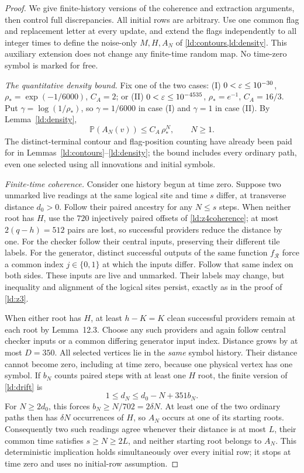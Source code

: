 \begin{proof}
We give finite-history versions of the coherence and extraction arguments, then control full discrepancies. All initial rows are arbitrary. Use one common flag and replacement letter at every update, and extend the flags independently to all integer times to define the noise-only $M,H,A_N$ of \cref{ld:contours,ld:density}. This auxiliary extension does not change any finite-time random map. No time-zero symbol is marked for free.

\emph{The quantitative density bound.} Fix one of the two cases:
(I) $0<\varepsilon\le10^{-30}$, $\rho_*=\exp(-1/6000)$, $C_A=2$; or
(II) $0<\varepsilon\le10^{-4535}$, $\rho_*=e^{-1}$, $C_A=16/3$. Put $\gamma=\log(1/\rho_*)$, so
$\gamma=1/6000$ in case (I) and $\gamma=1$ in case (II). By Lemma~\ref{ld:density},
\[
  \mathbb{P}(A_N(v))\le C_A\,\rho_*^N,\qquad N\ge1 .
\]
The distinct-terminal contour and flag-position counting have already been paid for in
Lemmas~\ref{ld:contours}--\ref{ld:density}; the bound includes every ordinary path, even one
selected using all innovations and initial symbols.

\emph{Finite-time coherence.}
Consider one history begun at time zero. Suppose two unmarked live readings at the same logical site and time $s$ differ, at transverse distance $d_0>0$. Follow their paired ancestry for any $N\le s$ steps. When neither root has $H$, use the $720$ injectively paired offsets of \cref{ld:z4coherence}; at most $2(q-h)=512$ pairs are lost, so successful providers reduce the distance by one. For the checker follow their central inputs, preserving their different tile labels. For the generator, distinct successful outputs of the same function $f_{\mathcal R}$ force a common index $j\in\{0,1\}$ at which the inputs differ. Follow that same index on both sides. These inputs are live and unmarked. Their labels may change, but inequality and alignment of the logical sites persist, exactly as in the proof of \cref{ld:z3}.

When either root has $H$, at least $h-K=K$ clean successful providers remain at each root by Lemma~12.3. Choose any such providers and again follow central checker inputs or a common differing generator input index. Distance grows by at most $D=350$. All selected vertices lie in the \emph{same} symbol history. Their distance cannot become zero, including at time zero, because one physical vertex has one symbol. If $b_N$ counts paired steps with at least one $H$ root, the finite version of \eqref{ld:drift} is
\[
 1\le d_N\le d_0-N+351b_N.
\]
For $N\ge2d_0$, this forces $b_N\ge N/702=2\delta N$. At least one of the two ordinary paths then has $\delta N$ occurrences of $H$, so $A_N$ occurs at one of its starting roots. Consequently two such readings agree whenever their distance is at most $L$, their common time satisfies $s\ge N\ge2L$, and neither starting root belongs to $A_N$. This deterministic implication holds simultaneously over every initial row; it stops at time zero and uses no initial-row assumption.


\end{proof}
